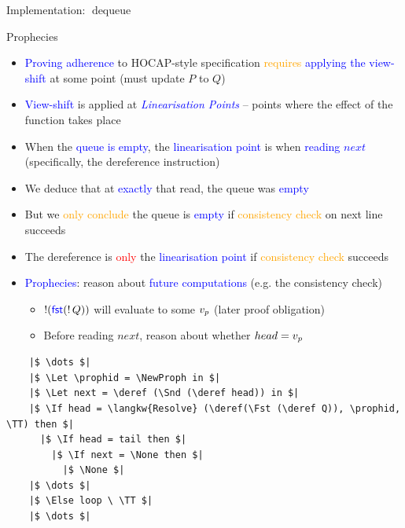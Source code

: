 \documentclass[9pt,xcolor={dvipsnames}]{beamer}
\newcommand{\dequeue}{\operatorname{dequeue}}
\newcommand{\locN}[1]{\loc_{\mathrm{#1}}}
\newcommand{\lochead}{\locN{head}}
\newcommand{\loctail}{\locN{tail}}
\newcommand{\node}{x}
\newcommand{\prophval}{\val_p}
\begin{document}
\begin{frame}[fragile]{Implementation: $\dequeue$}
\begin{center}
{
    }
    \end{center}
\end{frame}

\begin{frame}[fragile]{Prophecies}
  \begin{itemize}
    \item \textcolor{blue}{Proving adherence} to HOCAP-style specification \textcolor{orange}{requires} \textcolor{blue}{applying the view-shift} at some point (must update \textcolor{RubineRed}{$P$} to \textcolor{RubineRed}{$Q$})
    \item \textcolor{blue}{View-shift} is applied at \textcolor{blue}{\textit{Linearisation Points}} -- points where the effect of the function takes place
    \item When the \textcolor{blue}{queue is empty}, the \textcolor{blue}{linearisation point} is when \textcolor{blue}{reading $next$} (specifically, the dereference instruction)
    \item We deduce that at \textcolor{blue}{exactly} that read, the queue was \textcolor{blue}{empty}
    \item But we \textcolor{orange}{only conclude} the queue is \textcolor{blue}{empty} if \textcolor{orange}{consistency check} on next line succeeds
    \item The dereference is \textcolor{red}{only} the \textcolor{blue}{linearisation point} if \textcolor{orange}{consistency check} succeeds
    \item \textcolor{blue}{Prophecies}: reason about \textcolor{blue}{future computations} (e.g. \textcolor{ExampleColour}{the consistency check})
      \begin{itemize}
        \item $\mathop{!}(\operatorname{\textsf{\color{blue} fst}} (\mathop{!} Q))$ will evaluate to some $\prophval$ (later proof obligation)
        \item Before reading $next$, reason about whether $head = \prophval$
      \end{itemize}
  \end{itemize}
  \vspace{-8pt}
  \begin{verbatim}
    |$ \dots $|
    |$ \Let \prophid = \NewProph in $|
    |$ \Let next = \deref (\Snd (\deref head)) in $|
    |$ \If head = \langkw{Resolve} (\deref(\Fst (\deref Q)), \prophid, \TT) then $|
      |$ \If head = tail then $|
        |$ \If next = \None then $|
          |$ \None $|
    |$ \dots $|
    |$ \Else loop \ \TT $|
    |$ \dots $|
  \end{verbatim}
\end{frame}
\end{document}
